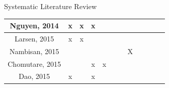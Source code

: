 \documentclass[aspectratio=169,10pt,xcolor={dvipsnames}]{beamer}
\begin{document}
\begin{frame}{Systematic Literature Review}
\begin{table}[]
{\begin{tabular}{c|c|c|c|c|c|c|ccc|c|c}
    Nguyen, 2014 \cite{nguyen_affective_2014}                     & x                                                               & x                 & x              &                &                                                                     &                       & \multicolumn{1}{c|}{}                  & \multicolumn{1}{c|}{}                                                               &               &                                                                  &                                                                         \\ \hline
    Larsen, 2015 \cite{larsen_we_2015}                            & x                                                               & x                 &                &                &                                                                     &                       & \multicolumn{1}{c|}{}                  & \multicolumn{1}{c|}{}                                                               &               &                                                                  &                                                                         \\ \hline
    Nambisan, 2015 \cite{nambisan_social_2015}                    &                                                                 &                   &                &                &                                                                     &                       & \multicolumn{1}{c|}{X}                 & \multicolumn{1}{c|}{}                                                               &               &                                                                  &                                                                         \\ \hline
    Chomutare, 2015 \cite{chomutare_mining_2015}                  &                                                                 &                   & x              & x              &                                                                     &                       & \multicolumn{1}{c|}{}                  & \multicolumn{1}{c|}{}                                                               &               &                                                                  &                                                                         \\ \hline
    Dao, 2015 \cite{dao_nonparametric_2015}                       & x                                                               &                   & x              &                &                                                                     &                       & \multicolumn{1}{c|}{}                  & \multicolumn{1}{c|}{}                                                               &               &                                                                  &                                                                         \\ \hline

\end{tabular}}
\end{table}
\end{frame}
\end{document}
